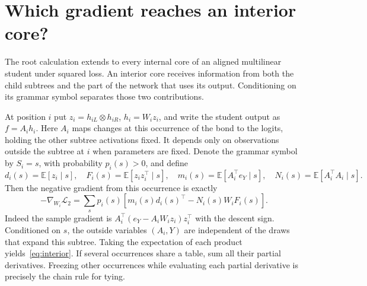 \section{Which gradient reaches an interior core?}
\label{sec:interior}
The root calculation extends to every internal core of an aligned multilinear
student under squared loss. An interior core receives information from both
the child subtrees and the part of the network that uses its output.
Conditioning on its grammar symbol separates those two contributions.

At position $i$ put $z_i=h_{iL}\otimes h_{iR}$, $h_i=W_i z_i$,
and write the student output as $f=A_i h_i$. Here $A_i$ maps changes
at this occurrence of the bond to the logits, holding the other subtree
activations fixed. It depends only on observations outside the subtree at $i$
when parameters are fixed. Denote the grammar symbol by $S_i=s$,
with probability $p_i(s)>0$, and define
\[
 d_i(s)=\mathbb E[z_i\mid s],\quad F_i(s)=\mathbb E[z_i z_i^\top\mid s],
 \quad m_i(s)=\mathbb E[A_i^\top e_Y\mid s],\quad
 N_i(s)=\mathbb E[A_i^\top A_i\mid s].
\]
Then the negative gradient from this occurrence is exactly
\begin{equation}
 -\nabla_{W_i}\mathcal L_2
 =\sum_s p_i(s)\left[m_i(s)d_i(s)^\top-N_i(s)W_iF_i(s)\right].
 \label{eq:interior}
\end{equation}
Indeed the sample gradient is
$A_i^\top(e_Y-A_i W_i z_i)z_i^\top$ with the descent sign.
Conditioned on $s$, the outside variables $(A_i,Y)$ are independent of
the draws that expand this subtree. Taking the expectation of each product
yields~\eqref{eq:interior}. If several occurrences share a table, sum all
their partial derivatives. Freezing other occurrences while evaluating
each partial derivative is precisely the chain rule for tying.


